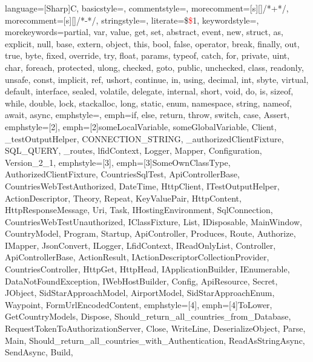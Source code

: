  {
	language=[Sharp]C,
	basicstyle=\ttfamily\scriptsize,
	commentstyle=\color{green},
	morecomment=[s][\color{green}]{/*+}{*/},
	morecomment=[s][\color{green}]{/*-}{*/},
	stringstyle=\color{red},
	literate={\$}{\textcolor{red}{\$}}{1},
	keywordstyle=\color{blue},
	morekeywords={partial, var, value, get, set, abstract, event, new, struct,
	as, explicit, null, base, extern, object, this, bool, false, operator,
	break, finally, out, true, byte, fixed, override, try, float, params,
	typeof, catch, for, private, uint, char, foreach, protected, ulong,
	checked, goto, public, unchecked, class, readonly, unsafe, const,
	implicit, ref, ushort, continue, in, using, decimal, int, sbyte, virtual,
	default, interface, sealed, volatile, delegate, internal, short, void,
	do, is, sizeof, while, double, lock, stackalloc, long, static,
	enum, namespace, string, nameof, await, async},
	emphstyle=\color{violet},
	emph={if, else, return, throw, switch, case, Assert},
	emphstyle={[2]\color{teal}},
	emph={[2]someLocalVariable, someGlobalVariable, Client, _testOutputHelper,
	CONNECTION_STRING, _authorizedClientFixture, SQL_QUERY, _routes, lfidContext,
	Logger, Mapper, Configuration, Version_2_1},
	emphstyle={[3]\color{cyan}},
	emph={[3]SomeOwnClassType, AuthorizedClientFixture, CountriesSqlTest, ApiControllerBase,
	CountriesWebTestAuthorized, DateTime, HttpClient, ITestOutputHelper, ActionDescriptor,
	Theory, Repeat, KeyValuePair, HttpContent, HttpResponseMessage, Uri, Task, IHostingEnvironment,
	SqlConnection, CountriesWebTestUnauthorized, IClassFixture, List, IDisposable, MainWindow,
	CountryModel, Program, Startup, ApiController, Produces, Route, Authorize, IMapper, JsonConvert,
	ILogger, LfidContext, IReadOnlyList, Controller, ApiControllerBase, ActionResult,
	IActionDescriptorCollectionProvider, CountriesController, HttpGet, HttpHead, IApplicationBuilder,
	IEnumerable, DataNotFoundException, IWebHostBuilder, Config, ApiResource, Secret, JObject,
	SidStarApproachModel, AirportModel, SidStarApproachEnum, Waypoint, FormUrlEncodedContent},
	emphstyle={[4]\color{brown}},
	emph={[4]ToLower, GetCountryModels, Dispose, Should_return_all_countries_from_Database,
	RequestTokenToAuthorizationServer, Close, WriteLine, DeserializeObject, Parse, Main,
	Should_return_all_countries_with_Authentication, ReadAsStringAsync, SendAsync, Build,
}}
